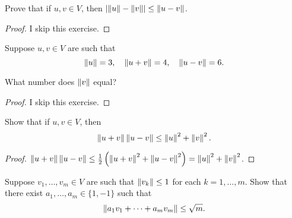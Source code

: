 \begin{exercise}
    Prove that if $u, v \in V$, then $\left\vert{\left\Vert{u}\right\Vert - \left\Vert{v}\right\Vert}\right\vert\leq \left\Vert{u - v}\right\Vert$.
\end{exercise}

\begin{proof}
    I skip this exercise.
\end{proof}
\newpage

\begin{exercise}
    Suppose $u, v \in V$ are such that
    \[
        \left\Vert{u}\right\Vert = 3, \quad \left\Vert{u + v}\right\Vert = 4, \quad \left\Vert{u - v}\right\Vert = 6.
    \]

    What number does $\left\Vert{v}\right\Vert$ equal?
\end{exercise}

\begin{proof}
    I skip this exercise.
\end{proof}
\newpage

\begin{exercise}
    Show that if $u, v \in V$, then
    \[
        \left\Vert{u + v}\right\Vert\left\Vert{u - v}\right\Vert\leq \left\Vert{u}\right\Vert^{2} + \left\Vert{v}\right\Vert^{2}.
    \]
\end{exercise}

\begin{proof}
    $\left\Vert{u + v}\right\Vert\left\Vert{u - v}\right\Vert \leq \frac{1}{2}\left(\left\Vert{u+v}\right\Vert^{2} + \left\Vert{u-v}\right\Vert^{2}\right) = \left\Vert{u}\right\Vert^{2} + \left\Vert{v}\right\Vert^{2}$.
\end{proof}
\newpage

\begin{exercise}
    Suppose $v_{1}, \ldots, v_{m}\in V$ are such that $\left\Vert{v_{k}}\right\Vert\leq 1$ for each $k = 1, \ldots, m$. Show that there exist $a_{1}, \ldots, a_{m}\in \{ 1, -1 \}$ such that
    \[
        \left\Vert{a_{1}v_{1} + \cdots + a_{m}v_{m}}\right\Vert \leq \sqrt{m}.
    \]
\end{exercise}

